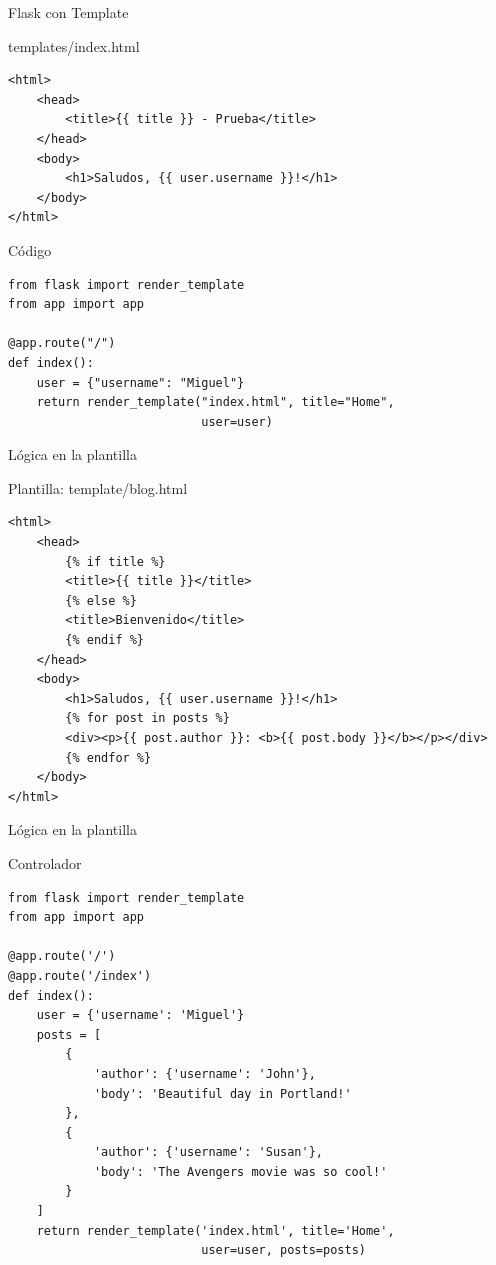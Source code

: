 \documentclass[bigger,unknownkeysallowed]{beamer}
\begin{document}
\begin{frame}[fragile,label={sec:orga01c260}]{Flask con Template}
 \begin{block}{templates/index.html}
\lstset{language=HTML,label= ,caption= ,captionpos=b,numbers=none}
\begin{lstlisting}
<html>
    <head>
        <title>{{ title }} - Prueba</title>
    </head>
    <body>
        <h1>Saludos, {{ user.username }}!</h1>
    </body>
</html>
\end{lstlisting}
\end{block}

\begin{exampleblock}{Código}
\lstset{language=Python,label= ,caption= ,captionpos=b,numbers=none}
\begin{lstlisting}
from flask import render_template
from app import app

@app.route("/")
def index():
    user = {"username": "Miguel"}
    return render_template("index.html", title="Home", 
                           user=user)
\end{lstlisting}
\end{exampleblock}
\end{frame}

\begin{frame}[fragile,label={sec:org4a9d252}]{Lógica en la plantilla}
 \begin{block}{Plantilla: template/blog.html}
\lstset{language=HTML,label= ,caption= ,captionpos=b,numbers=none}
\begin{lstlisting}
<html>
    <head>
        {% if title %}
        <title>{{ title }}</title>
        {% else %}
        <title>Bienvenido</title>
        {% endif %}
    </head>
    <body>
        <h1>Saludos, {{ user.username }}!</h1>
        {% for post in posts %}
        <div><p>{{ post.author }}: <b>{{ post.body }}</b></p></div>
        {% endfor %}
    </body>
</html>
\end{lstlisting}
\end{block}
\end{frame}

\begin{frame}[fragile,label={sec:org35db88a}]{Lógica en la plantilla}
 \begin{exampleblock}{Controlador}
\lstset{language=Python,label= ,caption= ,captionpos=b,numbers=none}
\begin{lstlisting}
from flask import render_template
from app import app

@app.route('/')
@app.route('/index')
def index():
    user = {'username': 'Miguel'}
    posts = [
        {
            'author': {'username': 'John'},
            'body': 'Beautiful day in Portland!'
        },
        {
            'author': {'username': 'Susan'},
            'body': 'The Avengers movie was so cool!'
        }
    ]
    return render_template('index.html', title='Home', 
                           user=user, posts=posts)
\end{lstlisting}
\end{exampleblock}
\end{frame}
\end{document}
